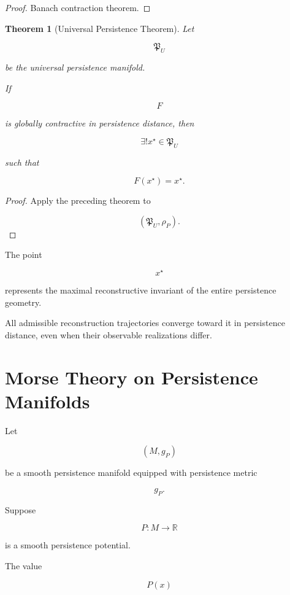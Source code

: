 \documentclass[12pt,oneside]{article}
\newtheorem{theorem}{Theorem}[section] \newtheorem{lemma}[theorem]{Lemma} \newtheorem{proposition}[theorem]{Proposition} \newtheorem{corollary}[theorem]{Corollary}
\theoremstyle{definition}
\begin{document}
\begin{proof}

Banach contraction theorem.

\end{proof}

\begin{theorem}[Universal Persistence Theorem]

Let

\[
\mathfrak P_U
\]

be the universal persistence manifold.

If

\[
F
\]

is globally contractive in persistence distance, then

\[
\exists!
x^\star
\in
\mathfrak P_U
\]

such that

\[
F(x^\star)
=
x^\star.
\]

\end{theorem}

\begin{proof}

Apply the preceding theorem to

\[
(\mathfrak P_U,\rho_P).
\]

\end{proof}

The point

\[
x^\star
\]

represents the maximal reconstructive invariant of the entire persistence geometry.

All admissible reconstruction trajectories converge toward it in persistence distance, even when their observable realizations differ.

\section{Morse Theory on Persistence Manifolds}

Let

\[
(M,g_P)
\]

be a smooth persistence manifold equipped with persistence metric

\[
g_P.
\]

Suppose

\[
P:M\rightarrow\mathbb R
\]

is a smooth persistence potential.

The value

\[
P(x)
\]
\end{document}
